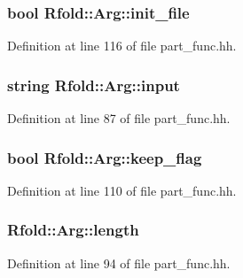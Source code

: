 \hypertarget{class_rfold_1_1_arg_a2cb4e22a01c0d933cc18dc2f48a05649}{
\subsubsection[{init\+\_\+file}]{\setlength{\rightskip}{0pt plus 5cm}bool Rfold\+::\+Arg\+::init\+\_\+file}}\label{class_rfold_1_1_arg_a2cb4e22a01c0d933cc18dc2f48a05649}


Definition at line 116 of file part\+\_\+func.\+hh.

\hypertarget{class_rfold_1_1_arg_a9844cbade756ff05f5c9592f17a63d95}{
\subsubsection[{input}]{\setlength{\rightskip}{0pt plus 5cm}string Rfold\+::\+Arg\+::input}}\label{class_rfold_1_1_arg_a9844cbade756ff05f5c9592f17a63d95}


Definition at line 87 of file part\+\_\+func.\+hh.

\hypertarget{class_rfold_1_1_arg_ab606ce2fd660a90d7af0f1d5773ffd57}{
\subsubsection[{keep\+\_\+flag}]{\setlength{\rightskip}{0pt plus 5cm}bool Rfold\+::\+Arg\+::keep\+\_\+flag}}\label{class_rfold_1_1_arg_ab606ce2fd660a90d7af0f1d5773ffd57}


Definition at line 110 of file part\+\_\+func.\+hh.

\hypertarget{class_rfold_1_1_arg_ae5c8053e399657b0c83bd10a904ac354}{
\subsubsection[{length}]{ Rfold\+::\+Arg\+::length}}\label{class_rfold_1_1_arg_ae5c8053e399657b0c83bd10a904ac354}


Definition at line 94 of file part\+\_\+func.\+hh.

